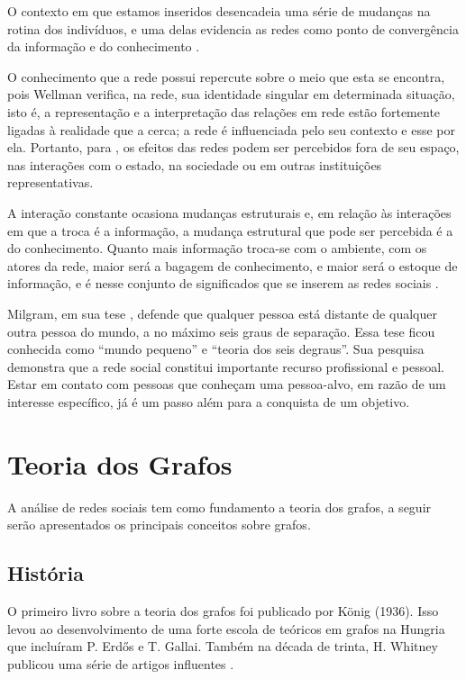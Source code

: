 O contexto em que estamos inseridos desencadeia uma série de mudanças na rotina dos indivíduos, e uma delas evidencia as redes como ponto de convergência da informação e do conhecimento \cite{Tomae:Alcara:Chiara:2005}.

O conhecimento que a rede possui repercute sobre o meio que esta se encontra, pois Wellman \cite{Wellman:1996} verifica, na rede, sua identidade singular em determinada situação, isto é, a representação e a interpretação das relações em rede estão fortemente ligadas à realidade que a cerca; a rede é influenciada pelo seu contexto e esse por ela. Portanto, para \cite{Marteleto:2001}, os efeitos das redes podem ser percebidos fora de seu espaço, nas interações com o estado, na sociedade ou em outras instituições representativas.

A interação constante ocasiona mudanças estruturais e, em relação às interações em que a troca é a informação, a mudança estrutural que pode ser percebida é a do conhecimento. Quanto mais informação troca-se com o ambiente, com os atores da rede, maior será a bagagem de conhecimento, e maior será o estoque de informação, e é nesse conjunto de significados que se inserem as redes sociais \cite{Tomae:Alcara:Chiara:2005}.

Milgram, em sua tese \cite{Milgram:1967}, defende que qualquer pessoa está distante de qualquer outra pessoa do mundo, a no máximo seis graus de separação. Essa tese ficou conhecida como ``mundo pequeno'' e ``teoria dos seis degraus''. Sua pesquisa demonstra que a rede social constitui importante recurso profissional e pessoal. Estar em contato com pessoas que conheçam uma pessoa-alvo, em razão de um interesse específico, já é um passo além para a conquista de um objetivo.

\section{Teoria dos Grafos}

A análise de redes sociais tem como fundamento a teoria dos grafos, a seguir serão apresentados os principais conceitos sobre grafos.

\subsection{História}

O primeiro livro sobre a teoria dos grafos foi publicado por König (1936). Isso levou ao desenvolvimento de uma forte escola de teóricos em grafos na Hungria que incluíram P. Erdős e T. Gallai. Também na década de trinta, H. Whitney publicou uma série de artigos influentes \cite{Bondy:2007}.

